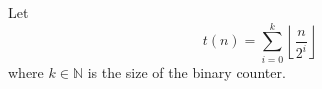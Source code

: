 Let
\begin{displaymath}
    t(n) = \sum_{i = 0}^{k} \left\lfloor\frac{n}{2^i}\right\rfloor
\end{displaymath}
where \(k \in \mathbb{N}\) is the size of the binary counter.